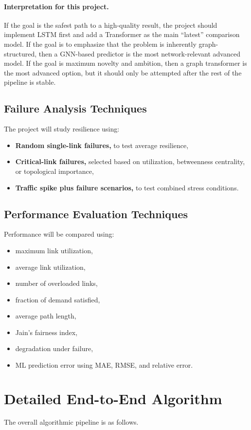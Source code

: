 \documentclass[11pt]{article}
\begin{document}
\paragraph{Interpretation for this project.}
If the goal is the safest path to a high-quality result, the project should implement LSTM first and add a Transformer as the main ``latest'' comparison model. If the goal is to emphasize that the problem is inherently graph-structured, then a GNN-based predictor is the most network-relevant advanced model. If the goal is maximum novelty and ambition, then a graph transformer is the most advanced option, but it should only be attempted after the rest of the pipeline is stable.

\subsection{Failure Analysis Techniques}
The project will study resilience using:
\begin{itemize}
    \item \textbf{Random single-link failures,} to test average resilience,
    \item \textbf{Critical-link failures,} selected based on utilization, betweenness centrality, or topological importance,
    \item \textbf{Traffic spike plus failure scenarios,} to test combined stress conditions.
\end{itemize}

\subsection{Performance Evaluation Techniques}
Performance will be compared using:
\begin{itemize}
    \item maximum link utilization,
    \item average link utilization,
    \item number of overloaded links,
    \item fraction of demand satisfied,
    \item average path length,
    \item Jain's fairness index,
    \item degradation under failure,
    \item ML prediction error using MAE, RMSE, and relative error.
\end{itemize}

\section{Detailed End-to-End Algorithm}
The overall algorithmic pipeline is as follows.
\end{document}
